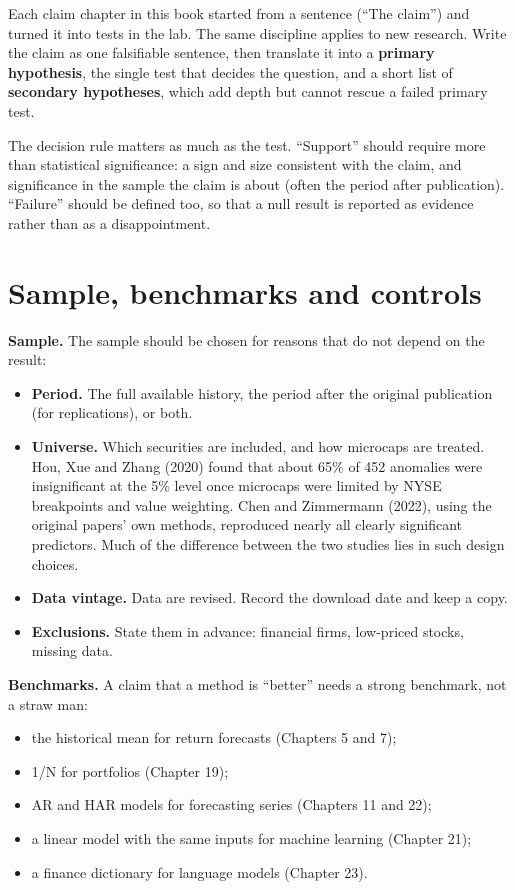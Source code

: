 Each claim chapter in this book started from a sentence (``The claim'') and turned it into tests in the lab. The same discipline applies to new research. Write the claim as one falsifiable sentence, then translate it into a \textbf{primary hypothesis}, the single test that decides the question, and a short list of \textbf{secondary hypotheses}, which add depth but cannot rescue a failed primary test.

The decision rule matters as much as the test. ``Support'' should require more than statistical significance: a sign and size consistent with the claim, and significance in the sample the claim is about (often the period after publication). ``Failure'' should be defined too, so that a null result is reported as evidence rather than as a disappointment.

\section{Sample, benchmarks and controls}
\label{sec:25-sample}

\textbf{Sample.} The sample should be chosen for reasons that do not depend on the result:

\begin{itemize}
  \item \textbf{Period.} The full available history, the period after the original publication (for replications), or both.
  \item \textbf{Universe.} Which securities are included, and how microcaps are treated. Hou, Xue and Zhang (2020) found that about 65\% of 452 anomalies were insignificant at the 5\% level once microcaps were limited by NYSE breakpoints and value weighting. Chen and Zimmermann (2022), using the original papers' own methods, reproduced nearly all clearly significant predictors. Much of the difference between the two studies lies in such design choices.
  \item \textbf{Data vintage.} Data are revised. Record the download date and keep a copy.
  \item \textbf{Exclusions.} State them in advance: financial firms, low-priced stocks, missing data.
\end{itemize}

\textbf{Benchmarks.} A claim that a method is ``better'' needs a strong benchmark, not a straw man:

\begin{itemize}
  \item the historical mean for return forecasts (Chapters 5 and 7);
  \item 1/N for portfolios (Chapter 19);
  \item AR and HAR models for forecasting series (Chapters 11 and 22);
  \item a linear model with the same inputs for machine learning (Chapter 21);
  \item a finance dictionary for language models (Chapter 23).
\end{itemize}

